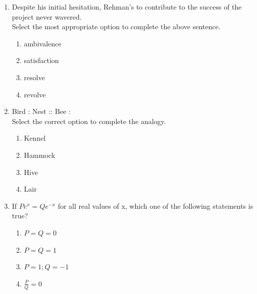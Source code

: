 \documentclass[journal]{IEEEtran}
\theoremstyle{remark}
\begin{document}
\begin{enumerate}
\item Despite his initial hesitation, Rehman's \underline{\hspace{2cm}} to contribute to the success of the project never wavered. \hfill{}\\
Select the most appropriate option to complete the above sentence.
\begin{multicols}{4}
\begin{enumerate}
\item ambivalence
\item satisfaction
\item resolve
\item revolve
\end{enumerate}
\end{multicols}

\item Bird : Nest :: Bee : \underline{\hspace{2cm}} \hfill{} \\
Select the correct option to complete the analogy.
\begin{multicols}{4}
\begin{enumerate}
\item Kennel
\item Hammock
\item Hive
\item Lair
\end{enumerate}
\end{multicols}

\item If $Pe^{x}=Qe^{-x}$ for all real values of x, which one of the following statements is true? \hfill{}
\begin{multicols}{2}
\begin{enumerate}
\item $P=Q=0$
\item $P=Q=1$
\item $P=1; Q=-1$
\item $\frac{P}{Q}=0$
\end{enumerate}
\end{multicols}


\end{enumerate}
\end{document}
